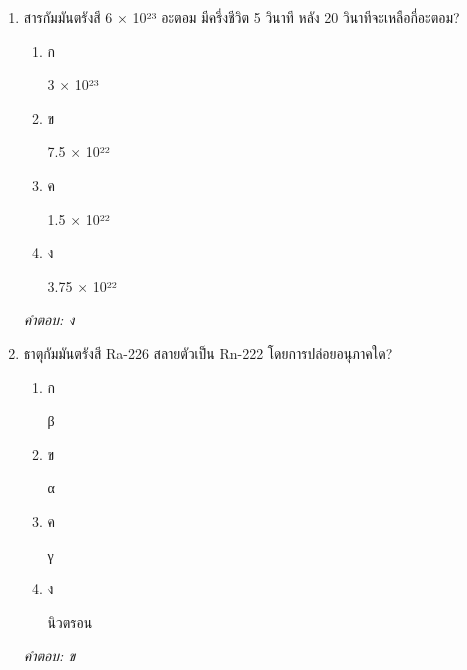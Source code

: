 \documentclass[12pt]{article}
\begin{document}
\begin{enumerate}[label=\arabic*., itemsep=0.5\baselineskip, topsep=0.5\baselineskip, leftmargin=*]
\item สารกัมมันตรังสี 6 × 10²³ อะตอม มีครึ่งชีวิต 5 วินาที หลัง 20 วินาทีจะเหลือกี่อะตอม?
\begin{enumerate}[label=\alph*)., itemsep=0.3\baselineskip, topsep=0.3\baselineskip]
\item ก\ 
\begin{minipage}[t]{0.9\linewidth}
\raggedright 3 × 10²³
\end{minipage}
\item ข\ 
\begin{minipage}[t]{0.9\linewidth}
\raggedright 7.5 × 10²²
\end{minipage}
\item ค\ 
\begin{minipage}[t]{0.9\linewidth}
\raggedright 1.5 × 10²²
\end{minipage}
\item ง\ 
\begin{minipage}[t]{0.9\linewidth}
\raggedright 3.75 × 10²²
\end{minipage}
\end{enumerate}
\vspace{-0.3\baselineskip}
\begin{small}
\textit{คำตอบ: ง}
\end{small}

\item ธาตุกัมมันตรังสี Ra-226 สลายตัวเป็น Rn-222 โดยการปล่อยอนุภาคใด?
\begin{enumerate}[label=\alph*)., itemsep=0.3\baselineskip, topsep=0.3\baselineskip]
\item ก\ 
\begin{minipage}[t]{0.9\linewidth}
\raggedright β
\end{minipage}
\item ข\ 
\begin{minipage}[t]{0.9\linewidth}
\raggedright α
\end{minipage}
\item ค\ 
\begin{minipage}[t]{0.9\linewidth}
\raggedright γ
\end{minipage}
\item ง\ 
\begin{minipage}[t]{0.9\linewidth}
\raggedright นิวตรอน
\end{minipage}
\end{enumerate}
\vspace{-0.3\baselineskip}
\begin{small}
\textit{คำตอบ: ข}
\end{small}


\end{enumerate}
\end{document}
